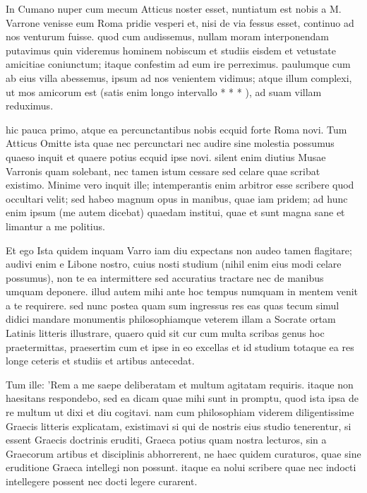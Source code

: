 
 In Cumano nuper cum mecum Atticus noster esset, nuntiatum est nobis a M. Varrone venisse eum Roma pridie vesperi et, nisi de via fessus esset, continuo ad nos venturum fuisse. quod cum audissemus, nullam moram interponendam putavimus quin videremus hominem nobiscum et studiis eisdem et vetustate amicitiae coniunctum; itaque confestim ad eum ire perreximus. paulumque cum ab eius villa abessemus, ipsum ad nos venientem vidimus; atque illum complexi, ut mos amicorum est (satis enim longo intervallo * * * ), ad suam villam reduximus.

 hic pauca primo, atque ea percunctantibus nobis ecquid forte Roma novi. Tum Atticus Omitte ista quae nec percunctari nec audire sine molestia possumus quaeso inquit et quaere potius ecquid ipse novi. silent enim diutius Musae Varronis quam solebant, nec tamen istum cessare sed celare quae scribat existimo. Minime vero inquit ille; intemperantis enim arbitror esse scribere quod occultari velit; sed habeo magnum opus in manibus, quae iam pridem; ad hunc enim ipsum (me autem dicebat) quaedam institui, quae et sunt magna sane et limantur a me politius.

 Et ego Ista quidem inquam Varro iam diu expectans non audeo tamen flagitare; audivi enim e Libone nostro, cuius nosti studium (nihil enim eius modi celare possumus), non te ea intermittere sed accuratius tractare nec de manibus umquam deponere. illud autem mihi ante hoc tempus numquam in mentem venit a te requirere. sed nunc postea quam sum ingressus res eas quas tecum simul didici mandare monumentis philosophiamque veterem illam a Socrate ortam Latinis litteris illustrare, quaero quid sit cur cum multa scribas genus hoc praetermittas, praesertim cum et ipse in eo excellas et id studium totaque ea res longe ceteris et studiis et artibus antecedat.

 Tum ille: 'Rem a me saepe deliberatam et multum agitatam requiris. itaque non haesitans respondebo, sed ea dicam quae mihi sunt in promptu, quod ista ipsa de re multum ut dixi et diu cogitavi. nam cum philosophiam viderem diligentissime Graecis litteris explicatam, existimavi si qui de nostris eius studio tenerentur, si essent Graecis doctrinis eruditi, Graeca potius quam nostra lecturos, sin a Graecorum artibus et disciplinis abhorrerent, ne haec quidem curaturos, quae sine eruditione Graeca intellegi non possunt. itaque ea nolui scribere quae nec indocti intellegere possent nec docti legere curarent.

